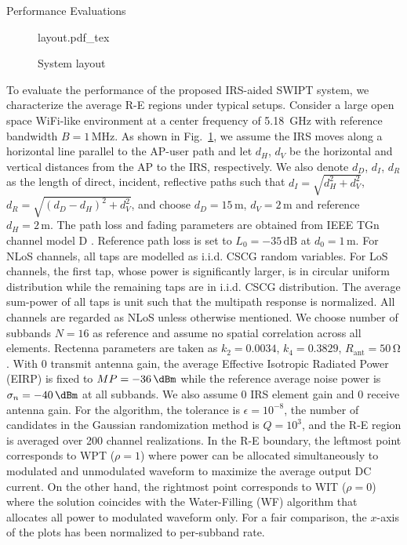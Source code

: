 \documentclass[journal]{IEEEtran}
\begin{document}
	\begin{section}{Performance Evaluations}\label{se:performance_evaluation}
		\begin{figure}[!t]
			\centering
			\def\svgwidth{\columnwidth}
			{layout.pdf_tex}
			\caption{System layout}
			\label{fi:layout}
		\end{figure}
		To evaluate the performance of the proposed IRS-aided SWIPT system, we characterize the average R-E regions under typical setups. Consider a large open space WiFi-like environment at a center frequency of \SI{5.18}{\GHz} with reference bandwidth $B=1\,\si{\MHz}$. As shown in Fig.~\ref{fi:layout}, we assume the IRS moves along a horizontal line parallel to the AP-user path and let $d_H$, $d_V$ be the horizontal and vertical distances from the AP to the IRS, respectively. We also denote $d_D$, $d_I$, $d_R$ as the length of direct, incident, reflective paths such that $d_I=\sqrt{d_H^2+d_V^2}$, $d_R=\sqrt{(d_D-d_H)^2+d_V^2}$, and choose $d_D=15\,\si{\meter}$, $d_V=2\,\si{\meter}$ and reference $d_H=2\,\si{\meter}$. The path loss and fading parameters are obtained from IEEE TGn channel model D \cite{Erceg2004}. Reference path loss is set to $L_0=-35\,\si{\dB}$ at $d_0=1\,\si{\meter}$. For NLoS channels, all taps are modelled as i.i.d. CSCG random variables. For LoS channels, the first tap, whose power is significantly larger, is in circular uniform distribution while the remaining taps are in i.i.d. CSCG distribution. The average sum-power of all taps is unit such that the multipath response is normalized. All channels are regarded as NLoS unless otherwise mentioned. We choose number of subbands $N=16$ as reference and assume no spatial correlation across all elements. Rectenna parameters are taken as $k_2=0.0034$, $k_4=0.3829$, $R_{\text{ant}}=50\,\si{\ohm}$. With \SI{0}{\dBi} transmit antenna gain, the average Effective Isotropic Radiated Power (EIRP) is fixed to $MP=-36\,\si{\dBm}$ while the reference average noise power is $\sigma_n=-40\,\si{\dBm}$ at all subbands. We also assume \SI{0}{\dBi} IRS element gain and \SI{0}{\dBi} receive antenna gain. For the algorithm, the tolerance is $\epsilon=10^{-8}$, the number of candidates in the Gaussian randomization method is $Q=10^{3}$, and the R-E region is averaged over \num{200} channel realizations. In the R-E boundary, the leftmost point corresponds to WPT ($\rho=1$) where power can be allocated simultaneously to modulated and unmodulated waveform to maximize the average output DC current. On the other hand, the rightmost point corresponds to WIT ($\rho=0$) where the solution coincides with the Water-Filling (WF) algorithm that allocates all power to modulated waveform only. For a fair comparison, the $x$-axis of the plots has been normalized to per-subband rate.


\end{section}
\end{document}

